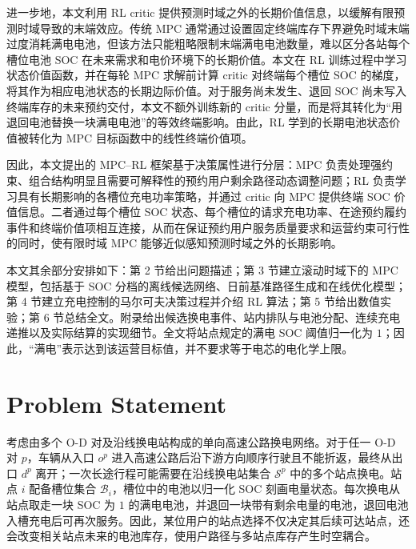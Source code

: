 \documentclass[12pt,a4paper,UTF8]{ctexart}
\begin{document}
进一步地，本文利用 RL critic 提供预测时域之外的长期价值信息，以缓解有限预测时域导致的末端效应。传统 MPC 通常通过设置固定终端库存下界避免时域末端过度消耗满电电池，但该方法只能粗略限制末端满电电池数量，难以区分各站每个槽位电池 SOC 在未来需求和电价环境下的长期价值。本文在 RL 训练过程中学习状态价值函数，并在每轮 MPC 求解前计算 critic 对终端每个槽位 SOC 的梯度，将其作为相应电池状态的长期边际价值。对于服务尚未发生、退回 SOC 尚未写入终端库存的未来预约交付，本文不额外训练新的 critic 分量，而是将其转化为“用退回电池替换一块满电电池”的等效终端影响。由此，RL 学到的长期电池状态价值被转化为 MPC 目标函数中的线性终端价值项。

因此，本文提出的 MPC--RL 框架基于决策属性进行分层：MPC 负责处理强约束、组合结构明显且需要可解释性的预约用户剩余路径动态调整问题；RL 负责学习具有长期影响的各槽位充电功率策略，并通过 critic 向 MPC 提供终端 SOC 价值信息。二者通过每个槽位 SOC 状态、每个槽位的请求充电功率、在途预约履约事件和终端价值项相互连接，从而在保证预约用户服务质量要求和运营约束可行性的同时，使有限时域 MPC 能够近似感知预测时域之外的长期影响。


本文其余部分安排如下：第 2 节给出问题描述；第 3 节建立滚动时域下的 MPC 模型，包括基于 SOC 分档的离线候选网络、日前基准路径生成和在线优化模型；第 4 节建立充电控制的马尔可夫决策过程并介绍 RL 算法；第 5 节给出数值实验；第 6 节总结全文。附录给出候选换电事件、站内排队与电池分配、连续充电递推以及实际结算的实现细节。全文将站点规定的满电 SOC 阈值归一化为 $1$；因此，“满电”表示达到该运营目标值，并不要求等于电芯的电化学上限。






\section{Problem Statement}

考虑由多个 O-D 对及沿线换电站构成的单向高速公路换电网络。对于任一 O-D 对 $p$，车辆从入口 $o^p$ 进入高速公路后沿下游方向顺序行驶且不能折返，最终从出口 $d^p$ 离开；一次长途行程可能需要在沿线换电站集合 $\mathcal S^p$ 中的多个站点换电。站点 $i$ 配备槽位集合 $\mathcal B_i$，槽位中的电池以归一化 SOC 刻画电量状态。每次换电从站点取走一块 SOC 为 $1$ 的满电电池，并退回一块带有剩余电量的电池，退回电池入槽充电后可再次服务。因此，某位用户的站点选择不仅决定其后续可达站点，还会改变相关站点未来的电池库存，使用户路径与多站点库存产生时空耦合。
\end{document}
